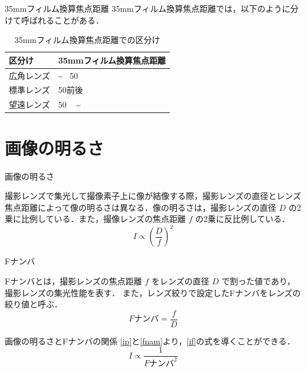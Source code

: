 \documentclass[8pt, jfont=ipaexm, t]{beamer} %
\begin{document}
\begin{frame}{35mmフィルム換算焦点距離}
  35mmフィルム換算焦点距離では，以下のように分けて呼ばれることがある．
  \begin{table}[H]
    \centering
    \caption{35mmフィルム換算焦点距離での区分け}
    \begin{tabular}{|l|l|}
      \hline
      区分け & 35mmフィルム換算焦点距離 \\
      \hline
      広角レンズ & \textasciitilde ~ 50 \\
      標準レンズ & 50前後 \\
      望遠レンズ & 50 ~ \textasciitilde \\
      \hline
    \end{tabular}
  \end{table}
\end{frame}


\section{画像の明るさ}
\begin{frame}{画像の明るさ}
\begin{block}{}
  撮影レンズで集光して撮像素子上に像が結像する際，撮影レンズの直径とレンズ焦点距離によって像の明るさは異なる．像の明るさは，撮影レンズの直径 $D$ の2乗に比例している．また，撮像レンズの焦点距離 $f$ の2乗に反比例している．
  \begin{equation}\label{ip}
    I \propto (\dfrac{D}{f})^2
  \end{equation}
\end{block}
\end{frame}

\begin{frame}{Fナンバ}
  \begin{block}{}
    Fナンバとは，撮影レンズの焦点距離 $f$ をレンズの直径 $D$ で割った値であり，撮影レンズの集光性能を表す．
    また，レンズ絞りで設定したFナンバをレンズの絞り値と呼ぶ．
    \begin{equation} \label{fnam}
      F\text{ナンバ} = \dfrac{f}{D}
    \end{equation}
  \end{block}

  \begin{block}{画像の明るさとFナンバの関係}
    \eqref{ip}と\eqref{fnam}より，\eqref{if}の式を導くことができる．
    \begin{equation} \label{if}
      I \propto \dfrac{1}{F\text{ナンバ}^2}
    \end{equation}
  \end{block}
\end{frame}
\end{document}
